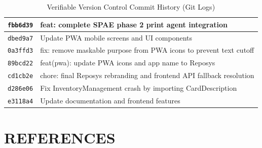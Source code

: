 \documentclass[12pt,a4paper,oneside]{report}
\begin{document}
\begin{table}[H]
\begin{tabularx}{\textwidth}{|p{0.75in}|X|}
\texttt{fbb6d39} & feat: complete SPAE phase 2 print agent integration \\ \hline
\texttt{dbed9a7} & Update PWA mobile screens and UI components \\ \hline
\texttt{0a3ffd3} & fix: remove maskable purpose from PWA icons to prevent text cutoff \\ \hline
\texttt{89bcd22} & feat(pwa): update PWA icons and app name to Reposys \\ \hline
\texttt{cd1cb2e} & chore: final Reposys rebranding and frontend API fallback resolution \\ \hline
\texttt{d286e06} & Fix InventoryManagement crash by importing CardDescription \\ \hline
\texttt{e3118a4} & Update documentation and frontend features \\ \hline
\end{tabularx}
\caption{Verifiable Version Control Commit History (Git Logs)}
\label{tab:git_logs}
\end{table}

\chapter{REFERENCES}
\end{document}
